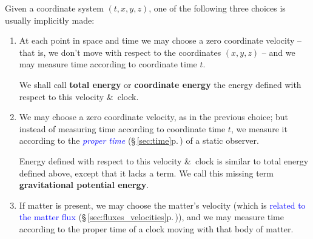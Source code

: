 \documentclass[a4paper,12pt,%
onecolumn,oneside,%
british%
]{memoir}
\newcommand*{\amp}{\&}
\renewcommand*{\|}[1][]{\nonscript\:#1\vert\nonscript\:\mathopen{}}
\newcommand*{\sect}{\S}%
\renewcommand*{\autoref}[3][\sect\,\ref]{\textcolor{blue}{#3} {\color{blue}\scriptsize(\faIcon[regular]{eye}\;#1{#2}\;p.\,\pageref{#2})}}
\newcommand*{\yE}{E}
\newcommand*{\yEk}{\yE_{\textrm{k}}}%
\newcommand*{\yEp}{\yE_{\textrm{p}}}%
\newcommand*{\yH}{\varPhi}%
\begin{document}
Given a coordinate system $(t,x,y,z)$, one of the following three choices is usually implicitly made:%
\begin{enumerate}[label=E\arabic*]
\item%
  \label{item:totalE}At each point in space and time we may choose a zero coordinate velocity -- that is, we don't move with respect to the coordinates $(x,y,z)$ -- and we may measure time according to coordinate time $t$.

  We shall call \textbf{total energy} or \textbf{coordinate energy} the energy defined with respect to this velocity \amp\ clock. %


\item%
  \label{item:noEp}We may choose a zero coordinate velocity, as in the previous choice; but instead of measuring time according to coordinate time $t$, we measure it according to the \autoref{sec:time}{\emph{proper time}} of a static observer.

  Energy defined with respect to this velocity \amp\ clock is similar to total energy defined above, except that it lacks a term. We call this missing term \textbf{gravitational potential energy}.



\item%
  \label{item:U}If matter is present, we may choose the matter's velocity (which is \autoref{sec:fluxes_velocities}{related to the matter flux}), and we may measure time according to the proper time of a clock moving with that body of matter.


\end{enumerate}
\end{document}
